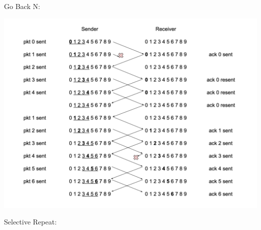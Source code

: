 \documentclass[11pt]{article}
\begin{document}
\begin{enumerate}[(a)]
      Go Back N:

      \includegraphics[width=15cm]{q1pb1}

      Selective Repeat:


\end{enumerate}
\end{document}
